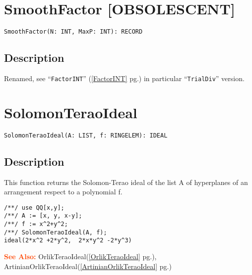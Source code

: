 \documentclass[a4paper]{mybook}
\newenvironment{command}{}{} %
\newcommand\SeeAlso{\par\textcolor{OrangeRed}{\textbf{\large See Also: }}}
\begin{document}
\section{SmoothFactor [OBSOLESCENT]}
\label{SmoothFactor [OBSOLESCENT]}
\begin{command} %


\begin{Verbatim}[label=syntax, rulecolor=\color{MidnightBlue},
frame=single]
SmoothFactor(N: INT, MaxP: INT): RECORD
\end{Verbatim}


\subsection*{Description}

Renamed, see ``\verb&FactorINT&'' (\ref{FactorINT} pg.\pageref{FactorINT}) in particular ``\verb&TrialDiv&'' version.

\end{command} %

\section{SolomonTeraoIdeal}
\label{SolomonTeraoIdeal}
\begin{command} %


\begin{Verbatim}[label=syntax, rulecolor=\color{MidnightBlue},
frame=single]
SolomonTeraoIdeal(A: LIST, f: RINGELEM): IDEAL 
\end{Verbatim}


\subsection*{Description}

This function returns the Solomon-Terao ideal of the list A of hyperplanes of an arrangement respect to a polynomial f.
\begin{Verbatim}[label=example, rulecolor=\color{PineGreen}, frame=single]
/**/ use QQ[x,y];	
/**/ A := [x, y, x-y];
/**/ f := x^2+y^2;
/**/ SolomonTeraoIdeal(A, f);
ideal(2*x^2 +2*y^2,  2*x*y^2 -2*y^3)
\end{Verbatim}


\SeeAlso %
  OrlikTeraoIdeal(\ref{OrlikTeraoIdeal} pg.\pageref{OrlikTeraoIdeal}), 
    ArtinianOrlikTeraoIdeal(\ref{ArtinianOrlikTeraoIdeal} pg.\pageref{ArtinianOrlikTeraoIdeal})
\end{command} %
\end{document}
